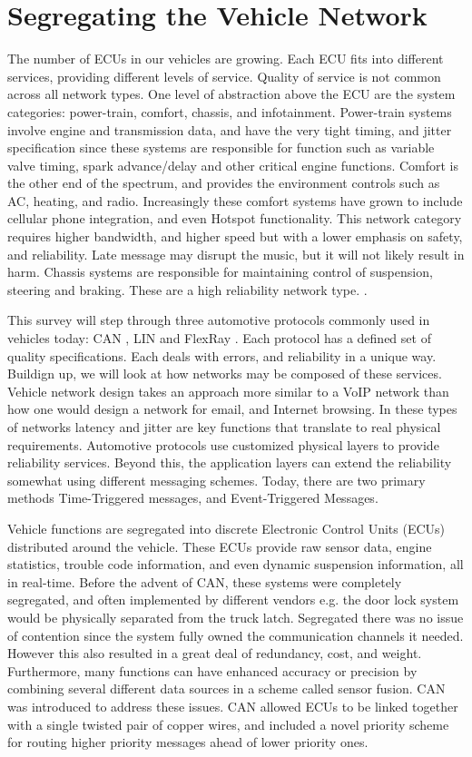 \documentclass[conference,12pt]{IEEEtran}
\begin{document}
\section{Segregating the Vehicle Network}
The number of ECUs in our vehicles are growing. Each ECU fits into different
services, providing different levels of service. Quality of service is not
common across all network types. 
One level of abstraction above the ECU are the system categories: power-train,
comfort, chassis, and infotainment.  Power-train systems involve engine and transmission
data, and have the very tight timing, and jitter specification since these
systems are responsible for function such as variable valve timing, spark
advance/delay and other critical engine functions. Comfort is the other end of
the spectrum, and provides the environment controls such as AC, heating, and
radio.  Increasingly these comfort systems have grown to include cellular phone
integration, and even Hotspot functionality. This network category requires
higher bandwidth, and higher speed but with a lower emphasis on safety, and
reliability. Late message may disrupt the music, but it will not likely result
in harm.  Chassis systems are responsible for maintaining control of suspension,
steering and braking. These are a high reliability network type.
\autocite{navet_trends_2005}.

This survey will step through three automotive protocols commonly used in
vehicles today: CAN \autocite{std_can}, LIN \autocite{std_lin} and FlexRay
\autocite{std_flexray}.  Each protocol has a defined set of quality
specifications. Each deals with errors, and reliability in a unique way.
Buildign up, we will look at how networks may be composed of these services.  
Vehicle network design takes an approach more similar
to a VoIP network than how one would design a network for email, and
Internet browsing.  In these types of networks latency and jitter are key functions that
translate to real physical requirements. Automotive protocols use customized
physical layers to provide reliability services. Beyond this, the application
layers can extend the reliability somewhat using different messaging schemes.
Today, there are two primary methods Time-Triggered messages, and
Event-Triggered Messages. 

Vehicle functions are segregated into discrete Electronic Control Units (ECUs)
distributed around the vehicle. These ECUs provide raw sensor data, engine
statistics, trouble code information, and even dynamic suspension information,
all in real-time. Before the advent of CAN, these systems were
completely segregated, and often implemented by different vendors e.g. the door
lock system would be physically separated from the truck latch.  Segregated
there was no issue of contention since the system fully owned the communication
channels it needed. However this also resulted in a great deal of redundancy,
cost, and weight.  Furthermore, many functions can have enhanced accuracy or
precision by combining several different data sources in a scheme called sensor
fusion.  CAN was introduced to address these issues.  CAN allowed ECUs to be
linked together with a single twisted pair of copper wires, and included a novel
priority scheme for routing higher priority messages ahead of lower priority
ones.
\end{document}
